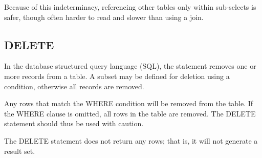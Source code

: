\documentclass[10pt,twoside,english]{_support/latex/sbabook/sbabook}
\begin{document}
Because of this indeterminacy, referencing other tables only within sub-selects
is safer, though often harder to read and slower than using a join.
\subsection{DELETE}
In the database structured query language (SQL), the 
statement removes one or more records from a table. A subset may be defined for
deletion using a condition, otherwise all records are removed.

Any rows that match the WHERE condition will be removed from the table. If the
WHERE clause is omitted, all rows in the table are removed. The DELETE statement
should thus be used with caution.

The DELETE statement does not return any rows; that is, it will not generate a
result set.



\backmatter

\end{document}
